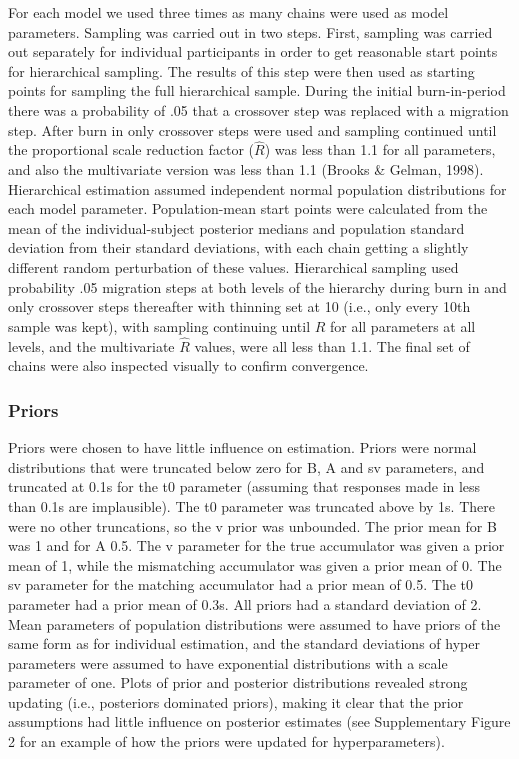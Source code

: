 \documentclass[
  man,floatsintext]{apa6}
\begin{document}
For each model we used three times as many chains were used as model parameters. Sampling was carried out in two steps. First, sampling was carried out separately for individual participants in order to get reasonable start points for hierarchical sampling. The results of this step were then used as starting points for sampling the full hierarchical sample. During the initial burn-in-period there was a probability of .05 that a crossover step was replaced with a migration step. After burn in only crossover steps were used and sampling continued until the proportional scale reduction factor (\(\hat{R}\)) was less than 1.1 for all parameters, and also the multivariate version was less than 1.1 (Brooks \& Gelman, 1998). Hierarchical estimation assumed independent normal population distributions for each model parameter. Population-mean start points were calculated from the mean of the individual-subject posterior medians and population standard deviation from their standard deviations, with each chain getting a slightly different random perturbation of these values. Hierarchical sampling used probability .05 migration steps at both levels of the hierarchy during burn in and only crossover steps thereafter with thinning set at 10 (i.e., only every 10th sample was kept), with sampling continuing until \(\hat{R}\) for all parameters at all levels, and the multivariate \(\hat{R}\) values, were all less than 1.1. The final set of chains were also inspected visually to confirm convergence.

\subsubsection{Priors}\label{priors}

Priors were chosen to have little influence on estimation. Priors were normal distributions that were truncated below zero for B, A and sv parameters, and truncated at 0.1s for the t0 parameter (assuming that responses made in less than 0.1s are implausible). The t0 parameter was truncated above by 1s. There were no other truncations, so the v prior was unbounded. The prior mean for B was 1 and for A 0.5. The v parameter for the true accumulator was given a prior mean of 1, while the mismatching accumulator was given a prior mean of 0. The sv parameter for the matching accumulator had a prior mean of 0.5. The t0 parameter had a prior mean of 0.3s. All priors had a standard deviation of 2. Mean parameters of population distributions were assumed to have priors of the same form as for individual estimation, and the standard deviations of hyper parameters were assumed to have exponential distributions with a scale parameter of one. Plots of prior and posterior distributions revealed strong updating (i.e., posteriors dominated priors), making it clear that the prior assumptions had little influence on posterior estimates (see Supplementary Figure 2 for an example of how the priors were updated for hyperparameters).
\end{document}
